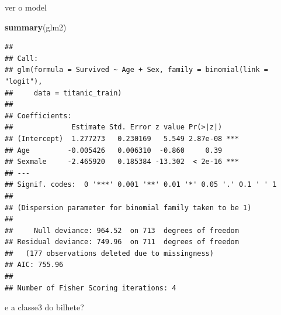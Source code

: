 \documentclass[
]{book}
\newenvironment{Shaded}{\begin{snugshade}}{\end{snugshade}}
\newcommand{\FunctionTok}[1]{\textcolor[rgb]{0.13,0.29,0.53}{\textbf{#1}}}
\newcommand{\NormalTok}[1]{#1}
\begin{document}
ver o model

\begin{Shaded}
\begin{Highlighting}[]
\FunctionTok{summary}\NormalTok{(glm2)}
\end{Highlighting}
\end{Shaded}

\begin{verbatim}
## 
## Call:
## glm(formula = Survived ~ Age + Sex, family = binomial(link = "logit"), 
##     data = titanic_train)
## 
## Coefficients:
##              Estimate Std. Error z value Pr(>|z|)    
## (Intercept)  1.277273   0.230169   5.549 2.87e-08 ***
## Age         -0.005426   0.006310  -0.860     0.39    
## Sexmale     -2.465920   0.185384 -13.302  < 2e-16 ***
## ---
## Signif. codes:  0 '***' 0.001 '**' 0.01 '*' 0.05 '.' 0.1 ' ' 1
## 
## (Dispersion parameter for binomial family taken to be 1)
## 
##     Null deviance: 964.52  on 713  degrees of freedom
## Residual deviance: 749.96  on 711  degrees of freedom
##   (177 observations deleted due to missingness)
## AIC: 755.96
## 
## Number of Fisher Scoring iterations: 4
\end{verbatim}

e a classe3 do bilhete?
\end{document}
